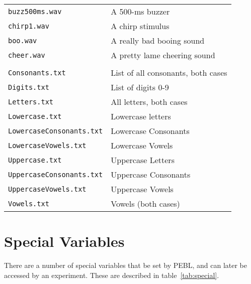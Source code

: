 \begin{longtable}{ll}
\texttt{buzz500ms.wav}   &A 500-ms buzzer\\
\texttt{chirp1.wav}      &A chirp stimulus\\
\texttt{boo.wav}         &A really bad booing sound\\
\texttt{cheer.wav}       &A pretty lame cheering sound\\
\addlinespace[.1cm]
\midrule
\addlinespace[.2cm]
\multicolumn{2}{l}{\textbf{In `media/text/'}:}\\
\addlinespace[.2cm]
\texttt{Consonants.txt}  &List of all consonants, both cases\\
\texttt{Digits.txt}               &List of digits 0-9\\
\texttt{Letters.txt}              &All letters, both cases\\
\texttt{Lowercase.txt}            &Lowercase letters\\
\texttt{LowercaseConsonants.txt}  &Lowercase Consonants\\
\texttt{LowercaseVowels.txt}      &Lowercase Vowels\\
\texttt{Uppercase.txt}            &Uppercase Letters\\
\texttt{UppercaseConsonants.txt}  &Uppercase Consonants\\
\texttt{UppercaseVowels.txt}      &Uppercase Vowels\\
\texttt{Vowels.txt}               &Vowels (both cases)\\

\end{longtable}

\vspace{1cm}


\section{Special Variables}

There are a number of special variables that be set by PEBL, 
and can later be accessed by an experiment. These are described in table~\ref{tab:special}.

